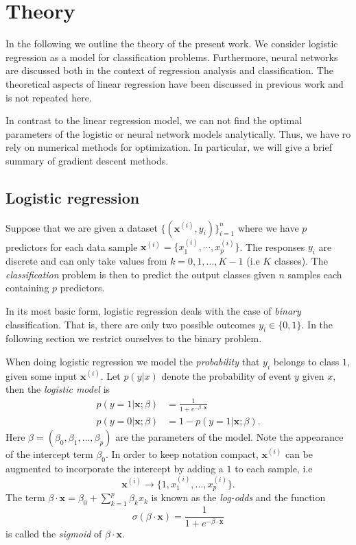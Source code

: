 \documentclass[a4paper, twocolumn]{article}
\begin{document}
\section{Theory}
In the following we outline the theory of the present work. We 
consider logistic regression as a model for classification problems. Furthermore, neural networks are discussed 
both in the context of regression analysis and classification. The theoretical aspects of linear regression have been 
discussed in previous work and is not repeated here.

In contrast to the linear regression model, we can not find the optimal parameters of the logistic or neural network 
models analytically. Thus, we have ro rely on numerical methods for optimization. In particular, we will give a brief summary
of gradient descent methods.

\subsection{Logistic regression}
Suppose that we are given a dataset $\{ (\mathbf{x}^{(i)}, y_i) \}_{i=1}^n $ where we have $p$ predictors 
for each data sample $\mathbf{x}^{(i)} = \{ x_1^{(i)}, \cdots, x_p^{(i)} \}$. The responses $y_i$ are discrete and 
can only take values from $k=0,1,\dots,K-1$ (i.e $K$ classes). The \textit{classification} problem is then to predict 
the output classes given $n$ samples each containing $p$ predictors. 

In its most basic form, logistic regression deals with the case of \textit{binary} classification. That is, there are only 
two possible outcomes $y_i \in \{0,1\}$. In the following section we restrict ourselves to the binary problem.

When doing logistic regression we model the \textit{probability} that $y_i$ belongs 
to class $1$, given some input $\mathbf{x}^{(i)}$. Let $p(y|x)$ denote the probability of event $y$ given $x$,
then the \textit{logistic model} is 
\begin{align}
 p \left(y=1 | \mathbf{x}; \beta \right) &= \frac{1}{1+e^{-\beta \cdot \mathbf{x}}} \\
 p \left(y=0 | \mathbf{x}; \beta \right) &= 1 - p \left(y=1 | \mathbf{x}; \beta \right).
\end{align}
Here $\beta = (\beta_0, \beta_1, \dots, \beta_p)$ are the parameters of the model. Note the appearance of the intercept 
term $\beta_0$. In order to keep notation compact, $\mathbf{x}^{(i)}$ can be augmented to incorporate the intercept by adding 
a $1$ to each sample, i.e 
\begin{equation*}
 \mathbf{x}^{(i)} \rightarrow \{ 1, x_1^{(i)}, \dots, x_p^{(i)} \}.
\end{equation*}
The term $\beta \cdot \mathbf{x} = \beta_0 + \sum_{k=1}^p \beta_k x_k $ is known as the \textit{log-odds} and the function 
\begin{equation}
\sigma(\beta \cdot \mathbf{x}) = \frac{1}{1+e^{-\beta \cdot \mathbf{x}}} 
\end{equation}
is called the \textit{sigmoid} of $\beta \cdot \mathbf{x}$. 
\end{document}

